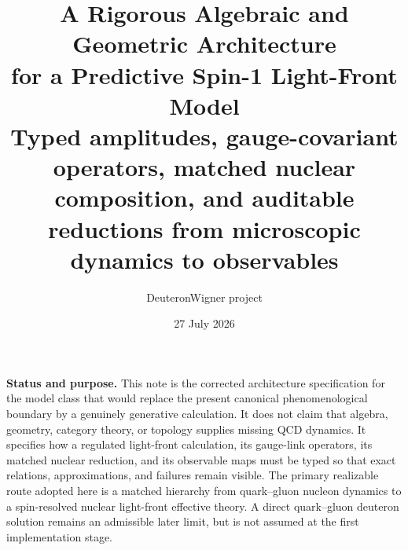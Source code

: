 \documentclass[11pt]{article}
\title{\vspace{-1.0cm}
{\color{navy}\bfseries A Rigorous Algebraic and Geometric Architecture\\[2mm]
for a Predictive Spin-1 Light-Front Model}\\[4mm]
\large Typed amplitudes, gauge-covariant operators, matched nuclear composition,
and auditable reductions from microscopic dynamics to observables}
\author{DeuteronWigner project}
\date{27 July 2026}
\begin{document}
\maketitle

\begin{center}
\begin{minipage}{0.94\textwidth}
\colorbox{softblue}{\parbox{0.96\textwidth}{
\textbf{Status and purpose.}
This note is the corrected architecture specification for the model class that
would replace the present canonical phenomenological boundary by a genuinely
generative calculation.  It does not claim that algebra, geometry, category
theory, or topology supplies missing QCD dynamics.  It specifies how a
regulated light-front calculation, its gauge-link operators, its matched
nuclear reduction, and its observable maps must be typed so that exact
relations, approximations, and failures remain visible.  The primary
realizable route adopted here is a matched hierarchy from quark--gluon
nucleon dynamics to a spin-resolved nuclear light-front effective theory.
A direct quark--gluon deuteron solution remains an admissible later limit, but
is not assumed at the first implementation stage.
}}
\end{minipage}
\end{center}
\end{document}
